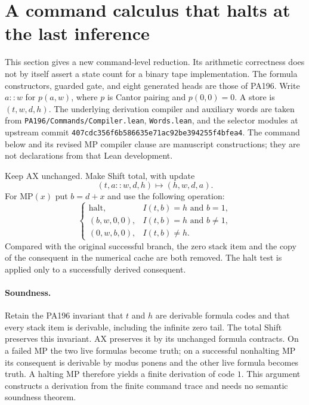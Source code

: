 \section{A command calculus that halts at the last inference}
\label{sec:halt-at-mp}

This section gives a new command-level reduction.  Its arithmetic correctness
does not by itself assert a state count for a binary tape implementation.
The formula constructors, guarded gate, and eight generated heads are those
of PA196.  Write $a::w$ for $p(a,w)$, where $p$ is Cantor pairing and
$p(0,0)=0$.  A store is $(t,w,d,h)$.
The underlying derivation compiler and auxiliary words are taken from
\texttt{PA196/Commands/Compiler.lean}, \texttt{Words.lean}, and the selector
modules at upstream commit
\texttt{407cdc356f6b586635e71ac92be394255f4bfea4}.
The command below and its revised MP compiler clause are manuscript
constructions; they are not declarations from that Lean development.

Keep AX unchanged.  Make Shift total, with update
\[
 (t,a::w,d,h)\longmapsto(h,w,d,a).
\]
For MP$(x)$ put $b=d+x$ and use the following operation:
\[
\begin{cases}
 \text{halt},& I(t,b)=h\text{ and }b=1,\\
 (b,w,0,0),& I(t,b)=h\text{ and }b\ne1,\\
 (0,w,b,0),& I(t,b)\ne h.
\end{cases}
\tag{MP$^\dagger$}
\]
Compared with the original successful branch, the zero stack item and the
copy of the consequent in the numerical cache are both removed.  The halt
test is applied only to a successfully derived consequent.

\paragraph{Soundness.}
Retain the PA196 invariant that $t$ and $h$ are derivable formula codes and
that every stack item is derivable, including the infinite zero tail.
The total Shift preserves this invariant.  AX preserves it by its unchanged
formula contracts.  On a failed MP the two live formulas become truth; on a
successful nonhalting MP its consequent is derivable by modus ponens and the
other live formula becomes truth.  A halting MP therefore yields a finite
derivation of code $1$.  This argument constructs a derivation from the
finite command trace and needs no semantic soundness theorem.

